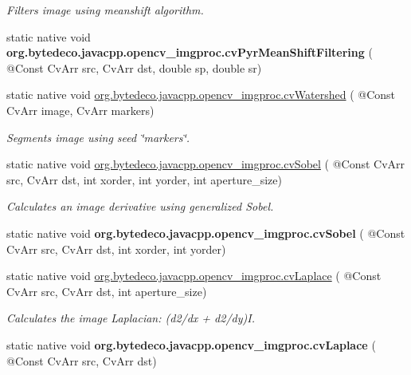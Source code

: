 \begin{DoxyCompactItemize}
\begin{DoxyCompactList}\small\item\em Filters image using meanshift algorithm. \end{DoxyCompactList}\item 
\mbox{\label{group__imgproc__c_ga8d5fa5aa4bf30790e2354052d2cd06db}} 
static native void {\bfseries org.\+bytedeco.\+javacpp.\+opencv\+\_\+imgproc.\+cv\+Pyr\+Mean\+Shift\+Filtering} ( @Const Cv\+Arr src, Cv\+Arr dst, double sp, double sr)
\item 
static native void \hyperlink{group__imgproc__c_gae7b6a113cdd9df18a224597d7e034810}{org.\+bytedeco.\+javacpp.\+opencv\+\_\+imgproc.\+cv\+Watershed} ( @Const Cv\+Arr image, Cv\+Arr markers)
\begin{DoxyCompactList}\small\item\em Segments image using seed \char`\"{}markers\char`\"{}. \end{DoxyCompactList}\item 
static native void \hyperlink{group__imgproc__c_ga8ef9469a1ca3c2940511a7f390eb6fb3}{org.\+bytedeco.\+javacpp.\+opencv\+\_\+imgproc.\+cv\+Sobel} ( @Const Cv\+Arr src, Cv\+Arr dst, int xorder, int yorder, int aperture\+\_\+size)
\begin{DoxyCompactList}\small\item\em Calculates an image derivative using generalized Sobel. \end{DoxyCompactList}\item 
\mbox{\label{group__imgproc__c_ga6e0b032f6d6f7ce3c1dd6778e22dcb95}} 
static native void {\bfseries org.\+bytedeco.\+javacpp.\+opencv\+\_\+imgproc.\+cv\+Sobel} ( @Const Cv\+Arr src, Cv\+Arr dst, int xorder, int yorder)
\item 
static native void \hyperlink{group__imgproc__c_ga4b503d9c276d19dbced13ecd77b845a2}{org.\+bytedeco.\+javacpp.\+opencv\+\_\+imgproc.\+cv\+Laplace} ( @Const Cv\+Arr src, Cv\+Arr dst, int aperture\+\_\+size)
\begin{DoxyCompactList}\small\item\em Calculates the image Laplacian\+: (d2/dx + d2/dy)I. \end{DoxyCompactList}\item 
\mbox{\label{group__imgproc__c_gadd37723664a035912cd654dfede889fe}} 
static native void {\bfseries org.\+bytedeco.\+javacpp.\+opencv\+\_\+imgproc.\+cv\+Laplace} ( @Const Cv\+Arr src, Cv\+Arr dst)

\end{DoxyCompactItemize}
